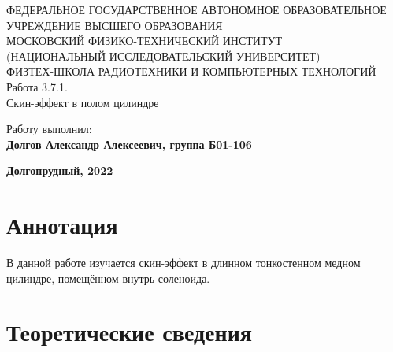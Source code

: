 \documentclass[15pt,a5paper,reqno]{article}
\begin{document}
\begin{center}
  {\small ФЕДЕРАЛЬНОЕ ГОСУДАРСТВЕННОЕ АВТОНОМНОЕ ОБРАЗОВАТЕЛЬНОЕ\\ УЧРЕЖДЕНИЕ ВЫСШЕГО ОБРАЗОВАНИЯ\\ МОСКОВСКИЙ ФИЗИКО-ТЕХНИЧЕСКИЙ ИНСТИТУТ\\ (НАЦИОНАЛЬНЫЙ ИССЛЕДОВАТЕЛЬСКИЙ УНИВЕРСИТЕТ)\\ ФИЗТЕХ-ШКОЛА РАДИОТЕХНИКИ И КОМПЬЮТЕРНЫХ ТЕХНОЛОГИЙ}\\
  \hfill \break
  \hfill \break
  \hfill \break
  \Huge{Работа 3.7.1. \\ Скин-эффект в полом цилиндре}\\
\end{center}

\hfill \break
\hfill \break
\hfill \break
\hfill \break
\hfill \break
\hfill \break
\hfill \break
\hfill \break

\begin{flushright}
  \normalsize{Работу выполнил:}\\
  \normalsize{\textbf{Долгов Александр Алексеевич, группа Б01-106}}\\
\end{flushright}

\begin{center}
  \normalsize{\textbf{Долгопрудный, 2022}}
\end{center}

\thispagestyle{empty} %


\newpage
\thispagestyle{plain}
\tableofcontents
\thispagestyle{plain}
\newpage

\section{Аннотация}

    В данной работе изучается скин-эффект в длинном тонкостенном медном цилиндре, помещённом внутрь соленоида.
	
\section{Теоретические сведения}
\end{document}
